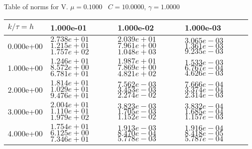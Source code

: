 \begin{center}
Table of norms for V. $\mu = 0.1000$ \, $C = 10.0000$, $\gamma = 1.0000$
  
\begin{tabular}{|p{1in}|p{1in}|p{1in}|p{1in}|} \hline
$k / \tau = h$ &1.000e-01 &1.000e-02 &1.000e-03 \\ \hline 
0.000e+00 & $2.738e+01$  $1.215e+01$  $1.757e+02$  & $2.039e+01$  $7.961e+00$  $1.048e+03$  & $3.065e-03$  $1.361e-03$  $9.235e-03$  \\ \hline 
1.000e+00 & $1.246e+01$  $8.572e+00$  $6.781e+01$  & $1.987e+01$  $7.869e+00$  $4.821e+02$  & $1.533e-03$  $6.767e-04$  $4.626e-03$  \\ \hline 
2.000e+00 & $1.814e+01$  $1.029e+01$  $9.476e+01$  & $7.562e-03$  $3.453e-03$  $2.274e-02$  & $7.666e-04$  $3.374e-04$  $2.314e-03$  \\ \hline 
3.000e+00 & $2.004e+01$  $1.110e+01$  $1.979e+02$  & $3.823e-03$  $1.705e-03$  $1.152e-02$  & $3.832e-04$  $1.685e-04$  $1.157e-03$  \\ \hline 
4.000e+00 & $1.754e+01$  $6.125e+00$  $7.346e+01$  & $1.913e-03$  $8.470e-04$  $5.778e-03$  & $1.916e-04$  $8.418e-05$  $5.787e-04$  \\ \hline 

\end{tabular}\\[20pt]
\end{center}
